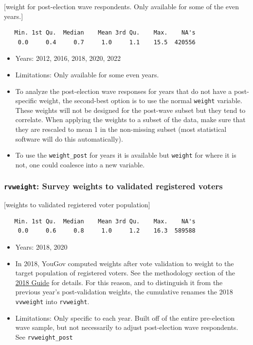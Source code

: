 \documentclass[10pt,article,oneside]{memoir}
\theoremstyle{definition}
\begin{document}
{[}weight for post-election wave respondents. Only available for some of
the even years.{]}

\begin{verbatim}
   Min. 1st Qu.  Median    Mean 3rd Qu.    Max.    NA's 
    0.0     0.4     0.7     1.0     1.1    15.5  420556 
\end{verbatim}

\begin{itemize}
\tightlist
\item
  Years: 2012, 2016, 2018, 2020, 2022
\item
  Limitations: Only available for some even years.
\item
  To analyze the post-election wave responses for years that do not have
  a post-specific weight, the second-best option is to use the normal
  \texttt{weight} variable. These weights will not be designed for the
  post-wave subset but they tend to correlate. When applying the weights
  to a subset of the data, make sure that they are rescaled to mean 1 in
  the non-missing subset (most statistical software will do this
  automatically).
\item
  To use the \texttt{weight\_post} for years it is available but
  \texttt{weight} for where it is not, one could coalesce into a new
  variable.
\end{itemize}

\subsubsection{\texorpdfstring{\texttt{rvweight}: Survey weights to
validated registered
voters}{rvweight: Survey weights to validated registered voters}}\label{rvweight-survey-weights-to-validated-registered-voters}

{[}weights to validated registered voter population{]}

\begin{verbatim}
   Min. 1st Qu.  Median    Mean 3rd Qu.    Max.    NA's 
    0.0     0.6     0.8     1.0     1.2    16.3  589588 
\end{verbatim}

\begin{itemize}
\tightlist
\item
  Years: 2018, 2020
\item
  In 2018, YouGov computed weights after vote validation to weight to
  the target population of registered voters. See the methodology
  section of the \href{https://doi.org/10.7910/DVN/ZSBZ7K}{2018 Guide}
  for details. For this reason, and to distinguish it from the previous
  year's post-validation weights, the cumulative renames the 2018
  \texttt{vvweight} into \texttt{rvweight}.
\item
  Limitations: Only specific to each year. Built off of the entire
  pre-election wave sample, but not necessarily to adjust post-election
  wave respondents. See \texttt{rvweight\_post}
\end{itemize}
\end{document}
